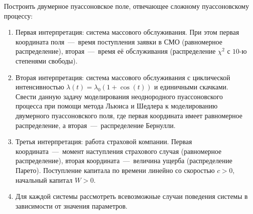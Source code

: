 Построить двумерное пуассоновское поле, отвечающее сложному 
 пуассоновскому процессу:

\begin{enumerate}
	\item Первая интерпретация: система массового обслуживания. При этом 
     первая координата поля~---~время поступления заявки в СМО 
     (равномерное распределение), вторая~---~время её обслуживания 
     (распределение \( \chi^2 \) с \( 10 \)-ю степенями свободы).
	
	\item Вторая интерпретация: система массового обслуживания с 
     циклической интенсивностью \( \lambda(t)=\lambda_0(1+\cos(t)) \) и 
     единичными скачками. Свести данную задачу моделирования 
     неоднородного пуассоновского процесса при помощи метода Льюиса и 
     Шедлера к моделированию двумерного пуассоновского поля, где первая 
     координата имеет равномерное распределение, а вторая~---~распределение 
     Бернулли.
	
	\item Третья интерпретация: работа страховой компании. Первая 
     координата~---~момент наступления страхового случая (равномерное 
     распределение), вторая координата~---~величина ущерба (распределение 
     Парето). Поступление капитала по времени линейно со скоростью 
     \( c>0 \), начальный капитал \( W>0 \).
	
	\item Для каждой системы рассмотреть всевозможные случаи поведения 
     системы в зависимости от значения параметров.
	
\end{enumerate}





